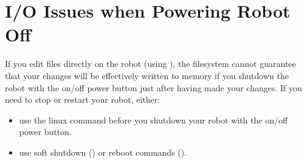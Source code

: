 \section{I/O Issues when Powering Robot Off}

If you edit files directly on the robot (using ), the
filesystem cannot guarantee that your changes will be effectively written to
memory if you shutdown the robot with the on/off power button just after
having made your changes. If you need to stop or restart your robot, either:
\begin{itemize}
\item use the  linux command before you shutdown your robot with
  the on/off power button.
\item use soft shutdown () or reboot commands ().
\end{itemize}

